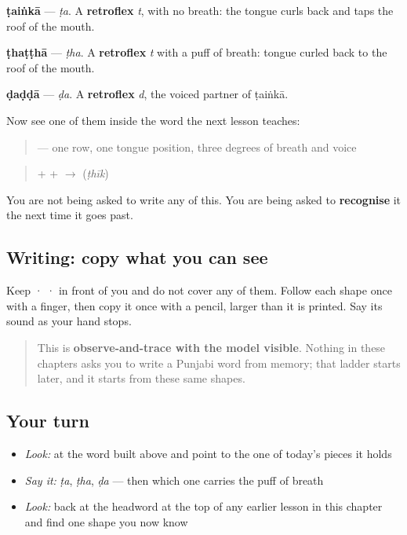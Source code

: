 \textbf{ṭaiṅkā} — \emph{ṭa}. A \textbf{retroflex} \emph{t}, with no breath: the tongue curls back and taps the roof of the mouth.

\begin{quote}
\end{quote}

\textbf{ṭhaṭṭhā} — \emph{ṭha}. A \textbf{retroflex} \emph{t} with a puff of breath: tongue curled back to the roof of the mouth.

\begin{quote}
\end{quote}

\textbf{ḍaḍḍā} — \emph{ḍa}. A \textbf{retroflex} \emph{d}, the voiced partner of ṭaiṅkā.

Now see one of them inside the word the next lesson teaches:

\begin{quote}
\textbf{}  \textbf{}  \textbf{} — one row, one tongue position, three degrees of breath and voice
\end{quote}

\begin{quote}
\textbf{} + \textbf{} + \textbf{} $\to$ \textbf{} (\emph{ṭhīk})
\end{quote}

You are not being asked to write any of this. You are being asked to \textbf{recognise} it the next time it goes past.

\subsection*{Writing: copy what you can see}

Keep  ·  ·  in front of you and do not cover any of them. Follow each shape once with a finger, then copy it once with a pencil, larger than it is printed. Say its sound as your hand stops.

\begin{quote}
This is \textbf{observe-and-trace with the model visible}. Nothing in these chapters asks you to write a Punjabi word from memory; that ladder starts later, and it starts from these same shapes.
\end{quote}

\subsection*{Your turn}
\begin{itemize}
\raggedright
  \item \emph{Look:} at the word built above and point to the one of today's pieces it holds
  \item \emph{Say it:} \emph{ṭa}, \emph{ṭha}, \emph{ḍa} — then which one carries the puff of breath
  \item \emph{Look:} back at the headword at the top of any earlier lesson in this chapter and find one shape you now know
\end{itemize}

